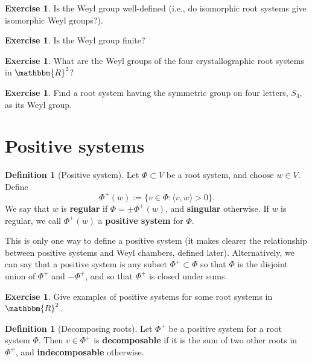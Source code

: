 \documentclass[12pt]{article}
\theoremstyle{remark}
\theoremstyle{definition}
\newtheorem{defn}[thm]{Definition}
\newtheorem{exercise}[thm]{Exercise}
\newcommand{\defnword}[1]{\textbf{#1}}
\newcommand{\R}{\mathbbm{R}}
\begin{document}
\begin{exercise}
Is the Weyl group well-defined (i.e., do isomorphic root systems give
isomorphic Weyl groups?).
\end{exercise}

\begin{exercise}
Is the Weyl group finite?
\end{exercise}

\begin{exercise}
What are the Weyl groups of the four crystallographic root systems in $\R^2$?
\end{exercise}

\begin{exercise}
Find a root system having the symmetric group on four letters, $S_4$,
as its Weyl group.
\end{exercise}

\section{Positive systems}

\begin{defn}[Positive system]
Let $\Phi \subset V$ be a root system, and choose $w \in V$.  Define
$$
\Phi^{+}(w) := \{ v \in \Phi : \langle v, w \rangle > 0 \}.
$$
We say that $w$ is \defnword{regular} if $\Phi = \pm \Phi^{+}(w)$,
and \defnword{singular} otherwise.  If $w$ is regular, we call
$\Phi^{+}(w)$ a \defnword{positive system} for $\Phi$.
\end{defn}
This is only one way to define a positive system (it makes clearer the
relationship between positive systems and Weyl chambers, defined
later).  Alternatively, we can say that a positive system is any
subset $\Phi^{+} \subset \Phi$ so that $\Phi$ is the disjoint union of
$\Phi^{+}$ and $-\Phi^{+}$, and so that $\Phi^{+}$ is closed under
sums.

\begin{exercise}
Give examples of positive systems for some  root systems in $\R^2$.
\end{exercise}

\begin{defn}[Decomposing roots]
Let $\Phi^{+}$ be a positive system for a root system $\Phi$.  Then $v \in \Phi^{+}$
is \defnword{decomposable} if it is the sum of two other roots in
$\Phi^{+}$, and \defnword{indecomposable} otherwise.
\end{defn}
\end{document}
